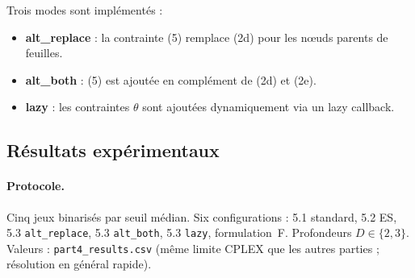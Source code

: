 \documentclass[a4paper,10pt,titlepage,leqno]{article}
\begin{document}
Trois modes sont implémentés :
\begin{itemize}
  \item \textbf{alt\_replace} : la contrainte (5) remplace (2d) pour les nœuds parents de feuilles.
  \item \textbf{alt\_both} : (5) est ajoutée en complément de (2d) et (2e).
  \item \textbf{lazy} : les contraintes $\theta$ sont ajoutées dynamiquement via un lazy callback.
\end{itemize}

\subsection{Résultats expérimentaux}

\paragraph{Protocole.} Cinq jeux binarisés par seuil médian. Six configurations : 5.1 standard, 5.2 ES, 5.3 \texttt{alt\_replace}, 5.3 \texttt{alt\_both}, 5.3 \texttt{lazy}, formulation~F. Profondeurs $D \in \{2,3\}$. Valeurs : \texttt{part4\_results.csv} (même limite CPLEX que les autres parties ; résolution en général rapide).
\end{document}
